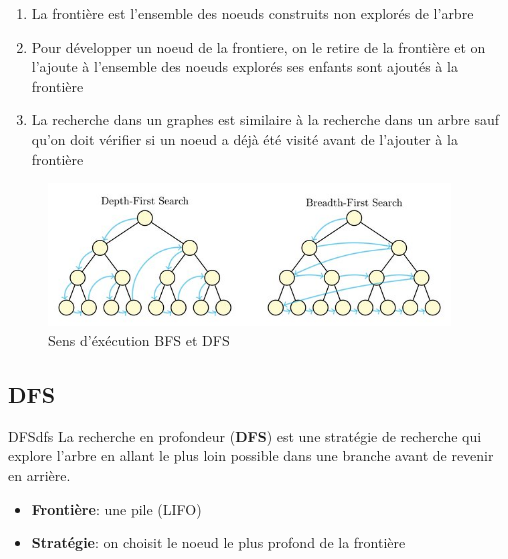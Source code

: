 \begin{remarks}\leavevmode
\begin{enumerate}
    \item La frontière est l'ensemble des noeuds construits non explorés de l'arbre
    \item Pour développer un noeud de la frontiere, on le retire de la frontière et on l'ajoute à l'ensemble des noeuds explorés
        ses enfants sont ajoutés à la frontière
    \item La recherche dans un graphes est similaire à la recherche dans un arbre sauf qu'on doit vérifier si un noeud a déjà été visité
        avant de l'ajouter à la frontière
\end{enumerate}
\end{remarks}



\begin{figure}[H]
    \begin{center}
        \includegraphics[width=0.95\textwidth]{./pictures/bfsschema.jpg}
    \end{center}
    \caption{Sens d'éxécution BFS et DFS}\label{fig:bfsschema}
\end{figure}



\subsection{DFS} %
\label{sub:dfs}

\begin{definition}{DFS}{dfs}
    La recherche en profondeur (\textbf{DFS}) est une stratégie de recherche qui explore l'arbre en allant le plus loin possible dans une branche avant de revenir en arrière. 
    \begin{itemize}
        \item \textbf{Frontière}: une pile (LIFO)
        \item \textbf{Stratégie}: on choisit le noeud le plus profond de la frontière
    \end{itemize} 
\end{definition}

